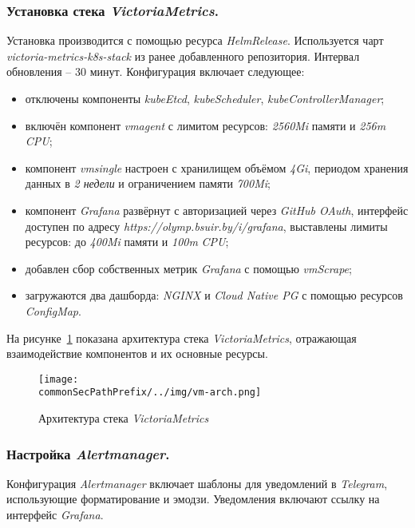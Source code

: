 \subsubsection{Установка стека \textit{VictoriaMetrics}.} Установка производится с помощью ресурса \textit{HelmRelease}. Используется чарт \textit{victoria-metrics-k8s-stack} из ранее добавленного репозитория. Интервал обновления -- 30 минут. Конфигурация включает следующее:

\begin{itemize}
    \item отключены компоненты \textit{kubeEtcd}, \textit{kubeScheduler}, \textit{kubeControllerManager};
    \item включён компонент \textit{vmagent} с лимитом ресурсов: \textit{2560Mi} памяти и \textit{256m} \textit{CPU};
    \item компонент \textit{vmsingle} настроен с хранилищем объёмом \textit{4Gi}, периодом хранения данных в \textit{2 недели} и ограничением памяти \textit{700Mi};
    \item компонент \textit{Grafana} развёрнут с авторизацией через \textit{GitHub OAuth}, интерфейс доступен по адресу \textit{https://olymp.bsuir.by/i/grafana}, выставлены лимиты ресурсов: до \textit{400Mi} памяти и \textit{100m} \textit{CPU};
    \item добавлен сбор собственных метрик \textit{Grafana} с помощью \textit{vmScrape};
    \item загружаются два дашборда: \textit{NGINX} и \textit{Cloud Native PG} с помощью ресурсов \textit{ConfigMap}.
\end{itemize}

На рисунке~\ref{fig:vmstack-architecture} показана архитектура стека \textit{VictoriaMetrics}, отражающая взаимодействие компонентов и их основные ресурсы.

\begin{figure}[ht]
    \centering
    \texttt{[image: \\commonSecPathPrefix/../img/vm-arch.png]}
    \caption{Архитектура стека \textit{VictoriaMetrics}}
    \label{fig:vmstack-architecture}
\end{figure}

\subsubsection{Настройка \textit{Alertmanager}.} Конфигурация \textit{Alertmanager} включает шаблоны для уведомлений в \textit{Telegram}, использующие форматирование и эмодзи. Уведомления включают ссылку на интерфейс \textit{Grafana}.

